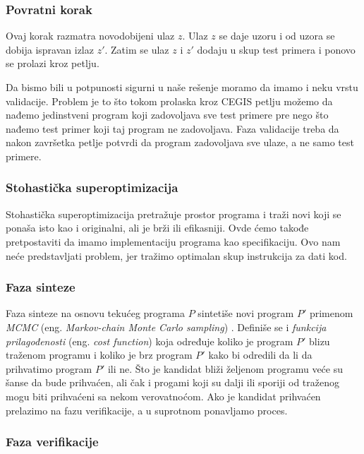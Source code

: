 \subsubsection*{Povratni korak}

Ovaj korak razmatra novodobijeni ulaz $z$. Ulaz $z$ se daje uzoru i od uzora se dobija ispravan izlaz $z'$. Zatim se ulaz $z$ i $z'$ dodaju u skup test primera i ponovo se prolazi kroz petlju.

Da bismo bili u potpunosti sigurni u naše rešenje moramo da imamo i neku vrstu validacije. Problem je to što tokom prolaska kroz CEGIS petlju možemo da nađemo jedinstveni program koji zadovoljava sve test primere pre nego što nađemo test primer koji taj program ne zadovoljava. Faza validacije treba da nakon završetka petlje potvrdi da program zadovoljava sve ulaze, a ne samo test primere.


\subsubsection{Stohastička superoptimizacija}
\label{subsec:StohastickaSuperoptimizacija}

Stohastička superoptimizacija pretražuje prostor programa i traži novi koji se ponaša isto kao i originalni, ali je brži ili efikasniji. Ovde ćemo takođe pretpostaviti da imamo implementaciju programa kao specifikaciju. Ovo nam neće predstavljati problem, jer tražimo optimalan skup instrukcija za dati kod.


\subsubsection*{Faza sinteze}


Faza sinteze na osnovu tekućeg programa $P$ sintetiše novi program $P'$ primenom \emph{MCMC} (eng. \emph{Markov-chain Monte Carlo sampling}) \cite{MCMC}. Definiše se i \emph{funkcija prilagođenosti} (eng. \emph{cost function}) koja određuje koliko je program $P'$ blizu traženom programu i koliko je brz program $P'$ kako bi odredili da li da prihvatimo program $P'$ ili ne. Što je kandidat bliži željenom programu veće su šanse da bude prihvaćen, ali čak i progami koji su dalji ili sporiji od traženog mogu biti prihvaćeni sa nekom verovatnoćom. Ako je kandidat prihvaćen prelazimo na fazu verifikacije, a u suprotnom ponavljamo proces.


\subsubsection*{Faza verifikacije}


